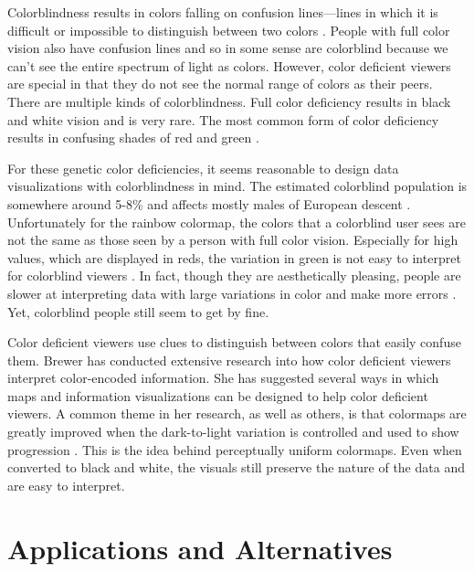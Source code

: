 \documentclass[journal,12pt]{IEEEtran}
\begin{document}
Colorblindness results in colors falling on confusion lines---lines in which it
is difficult or impossible to distinguish between two colors \cite{colormapping}. People with full
color vision also have confusion lines and so in some sense are colorblind because 
we can't see the entire spectrum of light as colors. However, color deficient viewers
are special in that they do not see the normal range of colors as their peers.
There are multiple kinds of colorblindness.
Full color deficiency results in black and white vision and is very rare.
The most common form of color deficiency results in confusing shades of red and green \cite{colorchoice}.

For these genetic color deficiencies, it seems reasonable to design data
visualizations with colorblindness in mind.
The estimated colorblind population is somewhere around 5-8\%
and affects mostly males of European descent \cite{colormapping}.
Unfortunately for the rainbow colormap,
the colors that a colorblind user sees are not the same as those seen by a person
with full color vision. Especially for high values, which are displayed in reds,
the variation in green is not easy to interpret for colorblind viewers \cite{mapcvi}. In fact,
though they are aesthetically pleasing, people are slower at interpreting data with
large variations in color and make more errors \cite{arteryvis}. Yet, colorblind people still seem
to get by fine.

Color deficient viewers use clues to distinguish between colors that easily confuse them.
Brewer has conducted extensive research into how color deficient
viewers interpret color-encoded information. She has suggested several ways in which 
maps and information visualizations can be designed to help color deficient viewers.
A common theme in her research, as well as others, is that colormaps are greatly
improved when the dark-to-light variation is controlled and used to show progression \cite{mapcvi}.
This is the idea behind perceptually uniform colormaps. Even when converted to black
and white, the visuals still preserve the nature of the data and are easy to interpret.

\section{Applications and Alternatives}
\end{document}
